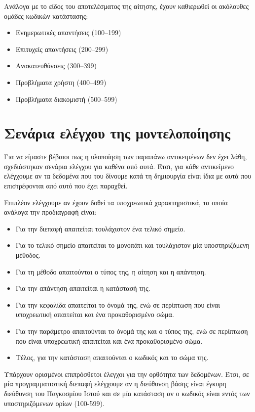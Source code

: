 \begin{itemize}
Ανάλογα με το είδος του αποτελέσματος της αίτησης,
έχουν καθιερωθεί οι ακόλουθες ομάδες κωδικών κατάστασης:

\begin{itemize}
    \item Ενημερωτικές απαντήσεις (100–199)
    \item Επιτυχείς απαντήσεις (200–299)
    \item Ανακατευθύνσεις (300–399)
    \item Προβλήματα χρήστη (400–499)
    \item Προβλήματα διακομιστή (500–599)
\end{itemize}

\end{itemize}

\section{Σενάρια ελέγχου της μοντελοποίησης}
Για να είμαστε βέβαιοι πως η υλοποίηση των παραπάνω αντικειμένων δεν έχει λάθη,
σχεδιάστηκαν σενάρια ελέγχου για καθένα από αυτά.
Έτσι, για κάθε αντικείμενο ελέγχουμε αν τα δεδομένα που του δίνουμε κατά τη δημιουργία 
είναι ίδια με αυτά που επιστρέφονται από αυτό που έχει παραχθεί.

Επιπλέον ελέγχουμε αν έχουν δοθεί τα υποχρεωτικά χαρακτηριστικά,
τα οποία ανάλογα την προδιαγραφή είναι:

\begin{itemize}
    \item Για την διεπαφή απαιτείται τουλάχιστον ένα τελικό σημείο.
    \item Για το τελικό σημείο απαιτείται το μονοπάτι και τουλάχιστον μία υποστηριζόμενη μέθοδος.
    \item Για τη μέθοδο απαιτούνται ο τύπος της, η αίτηση και η απάντηση.
    \item Για την απάντηση απαιτείται η κατάστασή της.
    \item Για την κεφαλίδα απαιτείται το όνομά της, ενώ σε περίπτωση που είναι υποχρεωτική απαιτείται και ένα προκαθορισμένο σώμα.
    \item Για την παράμετρο απαιτούνται το όνομά της και ο τύπος της, ενώ σε περίπτωση που είναι υποχρεωτική απαιτείται και ένα προκαθορισμένο σώμα.
    \item Τέλος, για την κατάσταση απαιτούνται ο κωδικός και το σώμα της.
\end{itemize}

Υπάρχουν ορισμένοι επιπρόσθετοι έλεγχοι για την ορθότητα των δεδομένων.
Έτσι, σε μία προγραμματιστική διεπαφή ελέγχουμε αν η διεύθυνση βάσης είναι έγκυρη διεύθυνση του Παγκοσμίου Ιστού
και σε μία κατάσταση αν ο κωδικός είναι εντός των υποστηριζόμενων ορίων (100-599).

